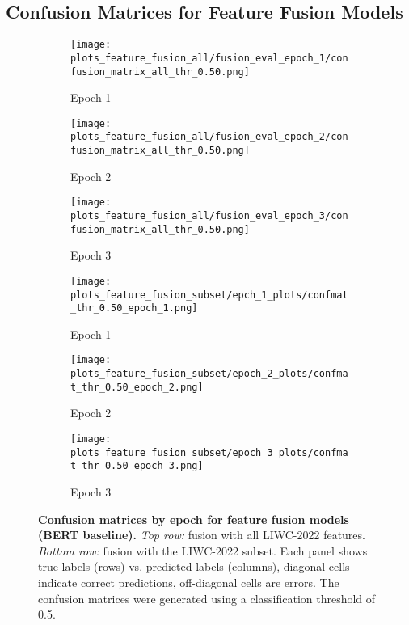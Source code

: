 \subsection{Confusion Matrices for Feature Fusion Models}


\begin{figure}[H]
  \centering

  \begin{subfigure}[t]{0.32\textwidth}
    \centering
    \texttt{[image: plots\_feature\_fusion\_all/fusion\_eval\_epoch\_1/confusion\_matrix\_all\_thr\_0.50.png]}
    \caption{Epoch 1}
    \label{fig:ff_all_e1}
  \end{subfigure}\hfill
  \begin{subfigure}[t]{0.32\textwidth}
    \centering
    \texttt{[image: plots\_feature\_fusion\_all/fusion\_eval\_epoch\_2/confusion\_matrix\_all\_thr\_0.50.png]}
    \caption{Epoch 2}
    \label{fig:ff_all_e2}
  \end{subfigure}\hfill
  \begin{subfigure}[t]{0.32\textwidth}
    \centering
    \texttt{[image: plots\_feature\_fusion\_all/fusion\_eval\_epoch\_3/confusion\_matrix\_all\_thr\_0.50.png]}
    \caption{Epoch 3}
    \label{fig:ff_all_e3}
  \end{subfigure}

  \vspace{0.45cm}

  \begin{subfigure}[t]{0.32\textwidth}
    \centering
    \texttt{[image: plots\_feature\_fusion\_subset/epch\_1\_plots/confmat\_thr\_0.50\_epoch\_1.png]}
    \caption{Epoch 1}
    \label{fig:ff_psy_e1}
  \end{subfigure}\hfill
  \begin{subfigure}[t]{0.32\textwidth}
    \centering
    \texttt{[image: plots\_feature\_fusion\_subset/epoch\_2\_plots/confmat\_thr\_0.50\_epoch\_2.png]}
    \caption{Epoch 2}
    \label{fig:ff_psy_e2}
  \end{subfigure}\hfill
  \begin{subfigure}[t]{0.32\textwidth}
    \centering
    \texttt{[image: plots\_feature\_fusion\_subset/epoch\_3\_plots/confmat\_thr\_0.50\_epoch\_3.png]}
    \caption{Epoch 3}
    \label{fig:ff_psy_e3}
  \end{subfigure}

  \caption[Confusion matrices by epoch for feature fusion models.]{\textbf{Confusion matrices by epoch for feature fusion models (BERT baseline).}
  \emph{Top row:} fusion with all LIWC-2022 features. \emph{Bottom row:} fusion with the LIWC-2022 subset.
  Each panel shows true labels (rows) vs. predicted labels (columns), diagonal cells indicate correct predictions, off-diagonal cells are errors. The confusion matrices were generated using a classification threshold of 0.5.}
  \label{fig:ff_confmats_epochs}
\end{figure}

